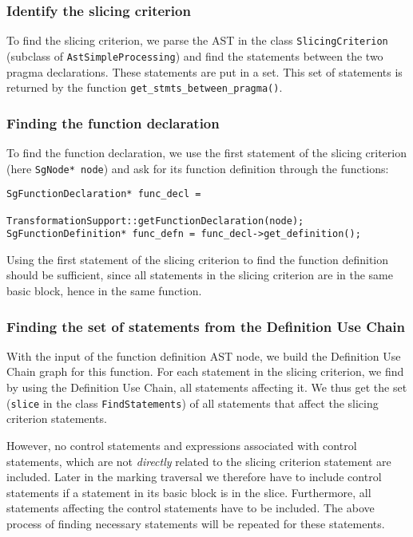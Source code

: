 \documentclass[11pt,a4paper,twoside]{article}
\begin{document}
\subsubsection{Identify the slicing criterion}
To find the slicing criterion, we parse the AST in the class \texttt{SlicingCriterion} (subclass of \texttt{AstSimpleProcessing}) and find the statements between the two pragma declarations. These statements are put in a set. This set of statements is returned by the function \texttt{get\_stmts\_between\_pragma()}.

\subsubsection{Finding the function declaration}
To find the function declaration, we use the first statement of the slicing criterion (here \texttt{SgNode* node}) and ask for its function definition through the functions:
\scriptsize
\begin{verbatim}
SgFunctionDeclaration* func_decl = 
                           TransformationSupport::getFunctionDeclaration(node);
SgFunctionDefinition* func_defn = func_decl->get_definition(); 
\end{verbatim}
\normalsize
Using the first statement of the slicing criterion to find the function definition should be sufficient, since all statements in the slicing criterion are in the same basic block, hence in the same function.



\subsubsection{Finding the set of statements from the Definition Use Chain}
With the input of the function definition AST node, we build the Definition Use Chain graph for this function. For each statement in the slicing criterion, we find by using the Definition Use Chain, all statements affecting it. We thus get the set (\texttt{slice} in the class \texttt{FindStatements}) of all statements that affect the slicing criterion statements.

However, no control statements and expressions associated with control statements, which are not \textit{directly} related to the slicing criterion statement are included.
Later in the marking traversal we therefore have to include control statements if a statement in its basic block is in the slice. Furthermore, all statements affecting the control statements have to be included. The above process of finding necessary statements will be repeated for these statements.\\
\end{document}

